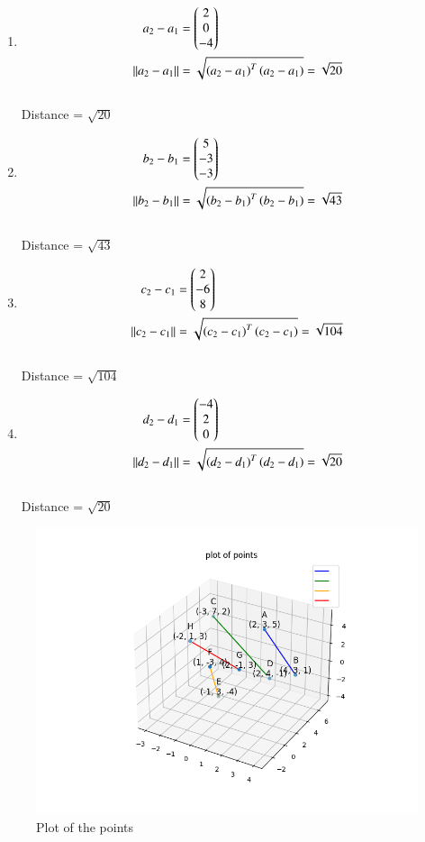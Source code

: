 \documentclass[journal]{IEEEtran}
\begin{document}
\begin{enumerate}
\item 
\begin{align}
	a_2-a_1 &= \begin{pmatrix}
		2\\
		0\\
		-4\\
	\end{pmatrix}\\
	\left\lVert a_2-a_1\right\rVert &= \sqrt{\left(a_2-a_1\right)^T \left(a_2-a_1\right)} = \sqrt{20}
\end{align}\\
Distance = $\sqrt{20}$
\item 
\begin{align}
	b_2-b_1 &= \begin{pmatrix}
		5\\
		-3\\
		-3\\
	\end{pmatrix}\\
	\left\lVert b_2-b_1\right\rVert &= \sqrt{\left(b_2-b_1\right)^T \left(b_2-b_1\right)} = \sqrt{43}
\end{align}\\
Distance = $\sqrt{43}$

\item 
\begin{align}
	c_2-c_1 &= \begin{pmatrix}
		2\\
		-6\\
		8\\
	\end{pmatrix}\\
	\left\lVert c_2-c_1\right\rVert &= \sqrt{\left(c_2-c_1\right)^T \left(c_2-c_1\right)} = \sqrt{104}
\end{align}\\
Distance = $\sqrt{104}$
\item 
\begin{align}
	d_2-d_1 &= \begin{pmatrix}
		-4\\
		2\\
		0\\
	\end{pmatrix}\\
	\left\lVert d_2-d_1\right\rVert &= \sqrt{\left(d_2-d_1\right)^T \left(d_2-d_1\right)} = \sqrt{20}
\end{align}\\
Distance = $\sqrt{20}$
\centering
\end{enumerate}
\begin{figure}[h!]
   \centering
   \includegraphics[width = 15cm]{figs/fig.png}
   \caption{Plot of the points}
   \label{stemplot}
\end{figure}
\end{document}
